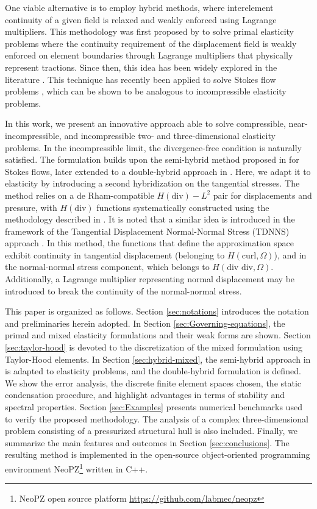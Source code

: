 \documentclass[english,11pt,3p,number,sort&compress]{elsarticle}
\begin{document}
One viable alternative is to employ hybrid methods, where interelement continuity of a given field is relaxed and weakly enforced using Lagrange multipliers. This methodology was first proposed by \cite{raviart1977primal} to solve primal elasticity problems where the continuity requirement of the displacement field is weakly enforced on element boundaries through Lagrange multipliers that physically represent tractions. Since then, this idea has been widely explored in the literature \cite{brezzi2012mixed, harder2016hybrid, farhloul1997dual}. This technique has recently been applied to solve Stokes flow problems \cite{carvalho2024semi,puga2025stable}, which can be shown to be analogous to incompressible elasticity problems. 

In this work, we present an innovative approach able to solve compressible, near-incompressible, and incompressible two- and three-dimensional elasticity problems. In the incompressible limit, the divergence-free condition is naturally satisfied. The formulation builds upon the semi-hybrid method proposed in \cite{carvalho2024semi} for Stokes flows, later extended to a double-hybrid approach in \cite{puga2025stable}. Here, we adapt it to elasticity by introducing a second hybridization on the tangential stresses. The method relies on a de Rham-compatible  $H(\text{div})-L^2$  pair for displacements and pressure, with $H(\text{div})$ functions systematically constructed using the methodology described in \cite{devloo2022efficient, de2013new}. It is noted that a similar idea is introduced in the framework of the Tangential Displacement Normal-Normal Stress (TDNNS) approach \cite{Joaquim2011}. In this method, the functions that define the approximation space exhibit continuity in tangential displacement (belonging to $H(\text{curl}, \Omega)$), and in the normal-normal stress component, which belongs to $H(\text{div div}, \Omega)$. Additionally, a Lagrange multiplier representing normal displacement may be introduced to break the continuity of the normal-normal stress.

This paper is organized as follows. Section \ref{sec:notations} introduces the notation and preliminaries herein adopted. In Section \ref{sec:Governing-equations}, the primal and mixed elasticity formulations and their weak forms are shown. Section \ref{sec:taylor-hood} is devoted to the discretization of the mixed formulation using Taylor-Hood elements. In Section \ref{sec:hybrid-mixed}, the semi-hybrid approach in \cite{carvalho2024semi} is adapted to elasticity problems, and the double-hybrid formulation is defined. We show the error analysis, the discrete finite element spaces chosen, the static condensation procedure, and highlight advantages in terms of stability and spectral properties. Section \ref{sec:Examples} presents numerical benchmarks used to verify the proposed methodology. The analysis of a complex three-dimensional problem consisting of a pressurized structural hull is also included. Finally, we summarize the main features and outcomes in Section \ref{sec:conclusions}. The resulting method is implemented in the open-source object-oriented programming environment NeoPZ\footnote{NeoPZ open source platform \url{https://github.com/labmec/neopz}} written in C++.
\end{document}
